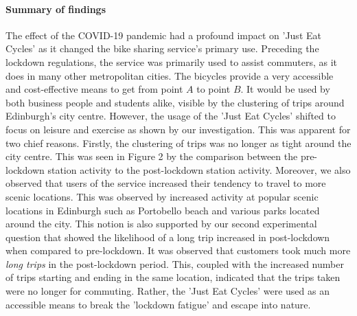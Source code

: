 \documentclass[11pt,a4paper]{article}
\begin{document}
\paragraph{Summary of findings}
The effect of the COVID-19 pandemic had a profound impact on 'Just Eat Cycles' as it changed the bike sharing service's primary use. Preceding the lockdown regulations, the service was primarily used to assist commuters, as it does in many other metropolitan cities. The bicycles provide a very accessible and cost-effective means to get from point $A$ to point $B$. It would be used by both business people and students alike, visible by the clustering of trips around Edinburgh's city centre. However, the usage of the 'Just Eat Cycles' shifted to focus on leisure and exercise as shown by our investigation. This was apparent for two chief reasons. Firstly, the clustering of trips was no longer as tight around the city centre. This was seen in Figure 2 by the comparison between the pre-lockdown station activity to the post-lockdown station activity. Moreover, we also observed that users of the service increased their tendency to travel to more scenic locations. This was observed by increased activity at popular scenic locations in Edinburgh such as Portobello beach and various parks located around the city. This notion is also supported by our second experimental question that showed the likelihood of a long trip increased in post-lockdown when compared to pre-lockdown. It was observed that customers took much more \emph{long trips} in the post-lockdown period. This, coupled with the increased number of trips  starting and ending in the same location, indicated that the trips taken were no longer for commuting. Rather, the 'Just Eat Cycles' were used as an accessible means to break the 'lockdown fatigue' and escape into nature.
\end{document}
